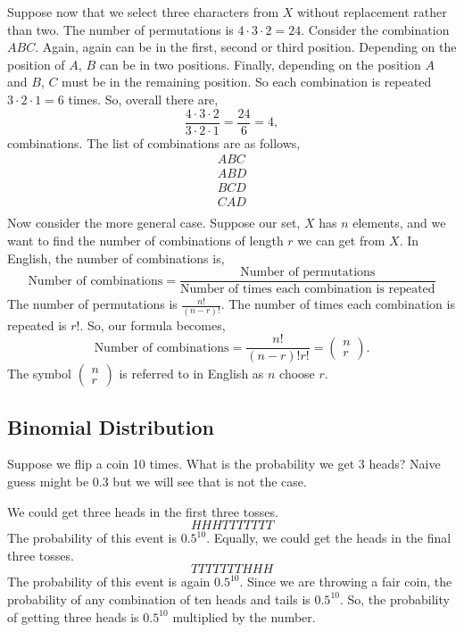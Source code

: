 \documentclass{article}
\begin{document}
Suppose now that we select three characters from $X$ without replacement rather than two. The number of permutations is $4 \cdot 3 \cdot 2 = 24$. Consider the combination $ABC$. Again, again can be in the first, second or third position. Depending on the position of $A$, $B$ can be in two positions. Finally, depending on the position $A$ and $B$, $C$ must be in the remaining position. So each combination is repeated $3 \cdot 2 \cdot 1 = 6$ times. So, overall there are,
$$
    \frac{4 \cdot 3 \cdot 2}{3 \cdot 2 \cdot 1} = \frac{24}{6} = 4,
$$
combinations. The list of combinations are as follows,
$$
\begin{matrix}
    ABC \\    
    ABD \\
    BCD \\
    CAD \\
\end{matrix}
$$
Now consider the more general case. Suppose our set, $X$ has $n$ elements, and we want to find the number of combinations of length $r$ we can get from $X$. In English, the number of combinations is,
$$
\text{Number of combinations} = \frac{\text{Number of permutations}}{\text{Number of times each combination is repeated}}
$$
The number of permutations is $\frac{n!}{(n - r)!}$. The number of times each combination is repeated is $r!$. So, our formula becomes,
$$
\text{Number of combinations} = \frac{n!}{(n - r)!r!} = 
\begin{pmatrix} n \\ r \end{pmatrix}.
$$
The symbol $\begin{pmatrix}n \\ r\end{pmatrix}$ is referred to in English as $n$ choose $r$.

\subsection{Binomial Distribution}
Suppose we flip a coin 10 times. What is the probability we get $3$ heads? Naive guess might be 0.3 but we will see that is not the case.

We could get three heads in the first three tosses.
$$
    HHHTTTTTTT
$$
The probability of this event is $0.5 ^ {10}$. Equally, we could get the heads in the final three tosses.
$$
    TTTTTTTHHH
$$
The probability of this event is again $0.5 ^ {10}$. Since we are throwing a fair coin, the probability of any combination of ten heads and tails is $0.5 ^ {10}$. So, the probability of getting three heads is $0.5 ^ {10}$ multiplied by the number.
\end{document}
